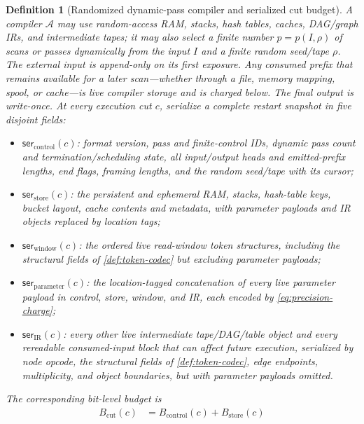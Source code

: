 \documentclass[aps,prx,reprint,floatfix,superscriptaddress]{revtex4-2}
\newtheorem{definition}{Definition}
\begin{document}
\begin{definition}[Randomized dynamic-pass compiler and serialized cut budget]
\label{def:compiler}
A compiler $\mathcal A$ may use random-access RAM, stacks, hash tables,
caches, DAG/graph IRs, and intermediate tapes; it may also select a finite
number $p=p(I,\rho)$ of scans or passes dynamically from the input $I$ and
a finite random seed/tape $\rho$.  The external input is append-only on its
first exposure.  Any consumed prefix that remains available for a later
scan---whether through a file, memory mapping, spool, or cache---is live
compiler storage and is charged below.  The final output is write-once.
At every execution cut $c$, serialize a complete restart snapshot in five
disjoint fields:
\begin{itemize}[leftmargin=1.5em]
    \item $\mathsf{ser}_{\mathrm{control}}(c)$: format version, pass and
    finite-control IDs, dynamic pass count and termination/scheduling state,
    all input/output heads and emitted-prefix lengths, end flags, framing
    lengths, and the random seed/tape with its cursor;
    \item $\mathsf{ser}_{\mathrm{store}}(c)$: the persistent and ephemeral
    RAM, stacks, hash-table keys, bucket layout, cache contents and metadata,
    with parameter payloads and IR objects replaced by location tags;
    \item $\mathsf{ser}_{\mathrm{window}}(c)$: the ordered live read-window
    token structures, including the structural fields of
    \cref{def:token-codec} but excluding parameter payloads;
    \item $\mathsf{ser}_{\mathrm{parameter}}(c)$: the location-tagged
    concatenation of every live parameter payload in control, store, window,
    and IR, each encoded by \eqref{eq:precision-charge};
    \item $\mathsf{ser}_{\mathrm{IR}}(c)$: every other live intermediate
    tape/DAG/table object and every rereadable consumed-input block that can
    affect future execution, serialized by node opcode, the structural
    fields of \cref{def:token-codec}, edge endpoints, multiplicity, and
    object boundaries, but with parameter payloads omitted.
\end{itemize}
The corresponding bit-level budget is
\begin{equation}
\label{eq:info-budget}
\boxed{
\begin{aligned}
B_{\mathrm{cut}}(c)
&=B_{\mathrm{control}}(c)+B_{\mathrm{store}}(c)\\

\end{aligned}}
\end{equation}
\end{definition}
\end{document}
